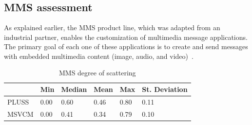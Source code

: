 \documentclass{sig-alt-full}
\begin{document}




\subsection{MMS assessment}

As explained earlier, the MMS product line, which was adapted from an industrial
partner, enables the customization of multimedia message applications. The
primary goal of each one of these applications is to create and send messages
with embedded multimedia content (image, audio, and video)~\cite{Bonifacio:2008aa}.


\begin{table}[thb] \centering
\caption{MMS degree of scattering}
\label{tab:mms-dos}
\begin{small}
\begin{tabular}{llllll} \hline
					& Min 	& Median 	& Mean 	& Max 	& St. Deviation \\ \hline 
	PLUSS			& 0.00  & 0.60   	& 0.46  & 0.80 	& 0.11 			\\
	MSVCM			& 0.00  & 0.41   	& 0.34 	& 0.79 	& 0.10			\\ \hline	
\end{tabular}
\end{small}
\end{table}
\end{document}
